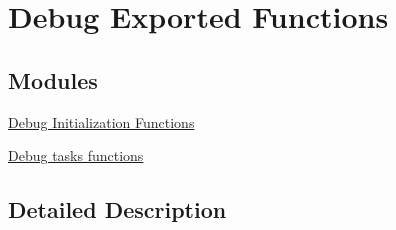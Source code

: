 \hypertarget{group___debug___exported___functions}{}\section{Debug Exported Functions}
\label{group___debug___exported___functions}
\subsection*{Modules}
\begin{DoxyCompactItemize}
\item 
\hyperlink{group___debug___exported___functions___group1}{Debug Initialization Functions}
\item 
\hyperlink{group___debug___exported___functions___group2}{Debug tasks functions}
\end{DoxyCompactItemize}


\subsection{Detailed Description}
